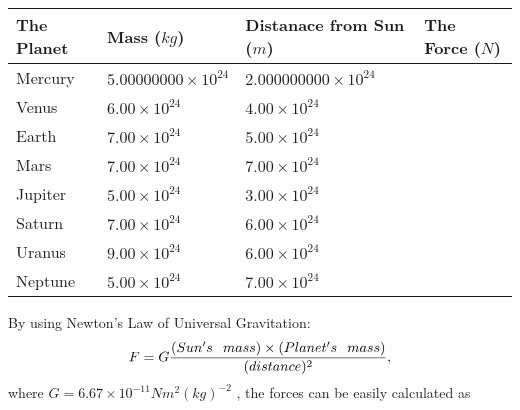 \documentclass[12pt]{article}
\begin{document}
 
\begin{tabular}{|l|l|l|l|}
\hline
The Planet & Mass ($kg$) & Distanace from Sun ($m$) & The Force ($N$)\\
\hline
Mercury  &
           $ %
5.00000000 \times 10^{24} $   &
             $ %
2.000000000 \times 10^{24} $    &
\\  \hline
Venus    &
           $ %
6.00 \times 10^{24} $    &
             $ %
4.00 \times 10^{24} $    &
\\  \hline
Earth    &
           $ %
7.00 \times 10^{24} $    &
             $ %
5.00 \times 10^{24} $    &
\\   \hline
Mars     &
           $ %
7.00 \times 10^{24} $    &
             $ %
7.00 \times 10^{24} $    &
\\   \hline
Jupiter  &
           $ %
5.00 \times 10^{24} $    &
             $ %
3.00 \times 10^{24} $    &
\\  \hline
Saturn   &
           $ %
7.00 \times 10^{24}$    &
             $ %
6.00 \times 10^{24}$    &
\\  \hline
Uranus   &
           $ %
9.00 \times 10^{24} $    &
             $ %
6.00 \times 10^{24} $    &
\\  \hline
Neptune  &
           $ %
5.00 \times 10^{24} $    &
             $ %
7.00 \times 10^{24} $    &
\\  \hline
 
\end{tabular}
 
 
 
 
\noindent{}
 
 

By using Newton's Law of Universal Gravitation:
\[
F=G \frac{(Sun's \hspace{0.1in} mass) \times (Planet's \hspace{0.1in} mass)} { (distance)^2},
\]
where
$ G= %
6.67 \times 10^{-11}N m^{2}(kg)^{-2}$ , the forces can be easily calculated as
 
\vspace{0.2in}
 
\end{document}
